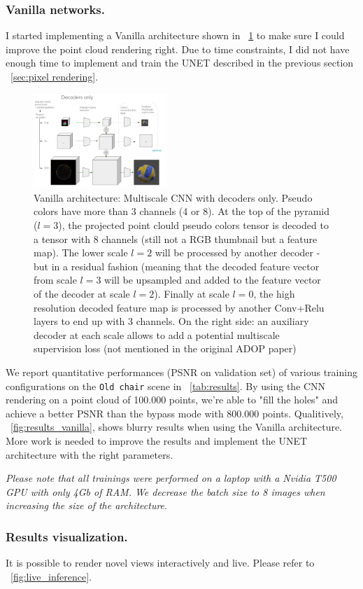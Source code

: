 \subsubsection{Vanilla networks.}
\label{sec:vanilla rendering}
I started implementing a Vanilla architecture shown in ~\cref{fig:decoders} to make sure I could improve the point cloud rendering right. Due to time constraints, I did not have enough time to implement and train the UNET described in the previous section ~\cref{sec:pixel rendering}.
\begin{figure}[H]
    \centering
    \includegraphics[width=0.45\textwidth]{figures/multiscale_decoders_only.png}
    \caption{Vanilla architecture: Multiscale CNN with decoders only. Pseudo colors have more than 3 channels (4 or 8). At the top of the pyramid ($l=3$), the projected point clould pseudo colors tensor is decoded to a tensor with 8 channels (still not a RGB thumbnail but a feature map). The lower scale $l=2$ will be processed by another decoder - but in a residual fashion (meaning that the decoded feature vector from scale $l=3$ will be upsampled and added to the feature vector of the decoder at scale $l=2$). Finally at scale $l=0$, the high resolution decoded feature map is processed by another Conv+Relu layers to end up with 3 channels. On the right side: an auxiliary decoder at each scale allows to add a potential multiscale supervision loss (not mentioned in the original ADOP paper)}
    \label{fig:decoders}
\end{figure}

We report quantitative performances (PSNR on validation set) of various training configurations on the \texttt{Old chair} scene in ~\cref{tab:results}. By using the CNN rendering on a point cloud of 100.000 points, we're able to "fill the holes" and achieve a better PSNR than the bypass mode with 800.000 points. Qualitively, ~\cref{fig:results_vanilla}, shows blurry results when using the Vanilla architecture. More work is needed to improve the results and implement the UNET architecture with the right parameters.

\textit{Please note that all trainings were performed on a laptop with a Nvidia T500 GPU with only 4Gb of RAM. We decrease the batch size to 8 images when increasing the size of the architecture}.

\subsubsection{Results visualization.}
It is possible to render novel views interactively and live. Please refer to ~\cref{fig:live_inference}.